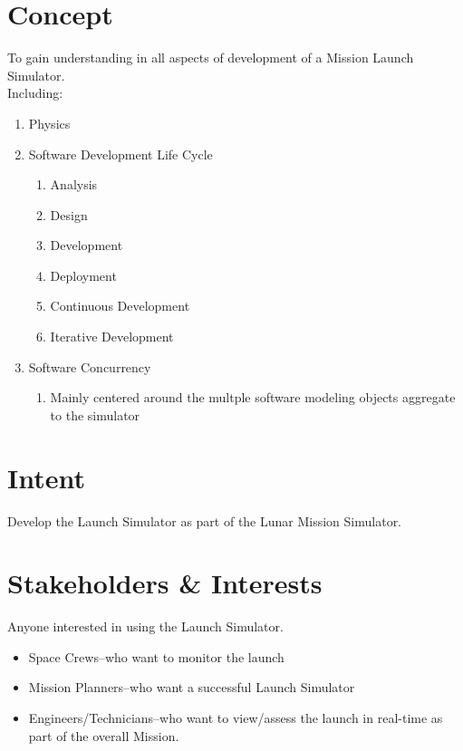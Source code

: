\documentclass[letterpaper]{article}
\begin{document}
\section{Concept}
To gain understanding in all aspects of development of a Mission
Launch Simulator.\\
Including:
\begin{enumerate}
\item Physics
\item Software Development Life Cycle
   \begin{enumerate}
      \item Analysis
      \item Design
      \item Development
      \item Deployment
      \item Continuous Development
      \item Iterative Development
   \end{enumerate}
\item Software Concurrency
   \begin{enumerate}
      \item Mainly centered around the multple software modeling
      objects aggregate to the simulator
   \end{enumerate}
\end{enumerate}

\section{Intent}
Develop the Launch Simulator as part of the Lunar Mission Simulator.

\section{Stakeholders \& Interests}
Anyone interested in using the Launch Simulator.
\begin{itemize}
   \item Space Crews--who want to monitor the launch
   \item Mission Planners--who want a successful Launch Simulator
   \item Engineers/Technicians--who want to view/assess the launch in
   real-time as part of the overall Mission.
\end{itemize}
\end{document}
